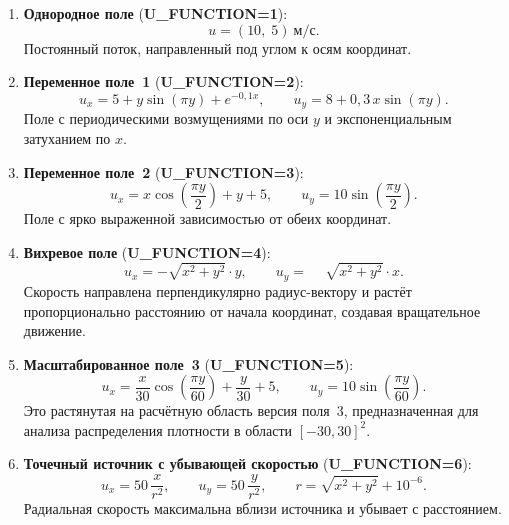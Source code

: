 \documentclass[14pt,a4paper]{extarticle}
\numberwithin{figure}{section}
\numberwithin{table}{section}
\begin{document}
\begin{enumerate}
    \item \textbf{Однородное поле} (\textbf{U\_FUNCTION=1}):
    \begin{equation}
        u = (10,\; 5)\ \text{м/с}.
    \end{equation}
    Постоянный поток, направленный под углом к осям координат.

    \item \textbf{Переменное поле~1} (\textbf{U\_FUNCTION=2}):
    \begin{equation}
        u_x = 5 + y\sin(\pi y) + e^{-0{,}1x}, \qquad
        u_y = 8 + 0{,}3\,x\sin(\pi y).
    \end{equation}
    Поле с периодическими возмущениями по оси $y$ и экспоненциальным затуханием по $x$.

    \item \textbf{Переменное поле~2} (\textbf{U\_FUNCTION=3}):
    \begin{equation}
        u_x = x\cos\!\left(\frac{\pi y}{2}\right) + y + 5, \qquad
        u_y = 10\sin\!\left(\frac{\pi y}{2}\right).
    \end{equation}
    Поле с ярко выраженной зависимостью от обеих координат.

    \item \textbf{Вихревое поле} (\textbf{U\_FUNCTION=4}):
    \begin{equation}
        u_x = -\sqrt{x^2 + y^2}\cdot y, \qquad
        u_y = \phantom{-}\sqrt{x^2 + y^2}\cdot x.
    \end{equation}
    Скорость направлена перпендикулярно радиус-вектору и растёт пропорционально
    расстоянию от начала координат, создавая вращательное движение.

    \item \textbf{Масштабированное поле~3} (\textbf{U\_FUNCTION=5}):
    \begin{equation}
        u_x = \frac{x}{30}\cos\!\left(\frac{\pi y}{60}\right) + \frac{y}{30} + 5, \qquad
        u_y = 10\sin\!\left(\frac{\pi y}{60}\right).
    \end{equation}
    Это растянутая на расчётную область версия поля~3, предназначенная для анализа
    распределения плотности в области $[-30,30]^2$.

    \item \textbf{Точечный источник с убывающей скоростью} (\textbf{U\_FUNCTION=6}):
    \begin{equation}
        u_x = 50\,\frac{x}{r^2}, \qquad u_y = 50\,\frac{y}{r^2},
        \qquad r = \sqrt{x^2 + y^2} + 10^{-6}.
    \end{equation}
    Радиальная скорость максимальна вблизи источника и убывает с расстоянием.


\end{enumerate}
\end{document}
